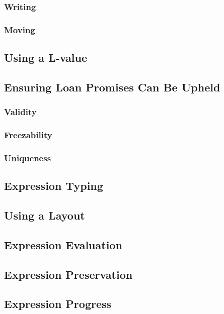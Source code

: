 \subsubsection*{Writing}
\subsubsection*{Moving}

\subsection*{Using a L-value}

\subsection*{Ensuring Loan Promises Can Be Upheld}
\subsubsection*{Validity}
\subsubsection*{Freezability}
\subsubsection*{Uniqueness}

\subsection*{Expression Typing}

\subsection*{Using a Layout}

\subsection*{Expression Evaluation}

\subsection*{Expression Preservation}

\subsection*{Expression Progress}
